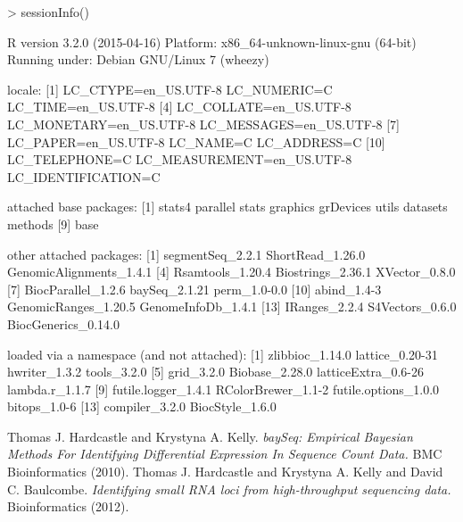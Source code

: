 \documentclass[a4paper]{article}
\begin{document}
\begin{Schunk}
\begin{Sinput}
> sessionInfo()
\end{Sinput}
\begin{Soutput}
R version 3.2.0 (2015-04-16)
Platform: x86_64-unknown-linux-gnu (64-bit)
Running under: Debian GNU/Linux 7 (wheezy)

locale:
 [1] LC_CTYPE=en_US.UTF-8       LC_NUMERIC=C               LC_TIME=en_US.UTF-8       
 [4] LC_COLLATE=en_US.UTF-8     LC_MONETARY=en_US.UTF-8    LC_MESSAGES=en_US.UTF-8   
 [7] LC_PAPER=en_US.UTF-8       LC_NAME=C                  LC_ADDRESS=C              
[10] LC_TELEPHONE=C             LC_MEASUREMENT=en_US.UTF-8 LC_IDENTIFICATION=C       

attached base packages:
[1] stats4    parallel  stats     graphics  grDevices utils     datasets  methods  
[9] base     

other attached packages:
 [1] segmentSeq_2.2.1        ShortRead_1.26.0        GenomicAlignments_1.4.1
 [4] Rsamtools_1.20.4        Biostrings_2.36.1       XVector_0.8.0          
 [7] BiocParallel_1.2.6      baySeq_2.1.21           perm_1.0-0.0           
[10] abind_1.4-3             GenomicRanges_1.20.5    GenomeInfoDb_1.4.1     
[13] IRanges_2.2.4           S4Vectors_0.6.0         BiocGenerics_0.14.0    

loaded via a namespace (and not attached):
 [1] zlibbioc_1.14.0      lattice_0.20-31      hwriter_1.3.2        tools_3.2.0         
 [5] grid_3.2.0           Biobase_2.28.0       latticeExtra_0.6-26  lambda.r_1.1.7      
 [9] futile.logger_1.4.1  RColorBrewer_1.1-2   futile.options_1.0.0 bitops_1.0-6        
[13] compiler_3.2.0       BiocStyle_1.6.0     
\end{Soutput}
\end{Schunk}

\begin{thebibliography}{99}
 Thomas J. Hardcastle and Krystyna A. Kelly. \textsl{baySeq: Empirical Bayesian Methods For Identifying Differential Expression In Sequence Count Data.} BMC Bioinformatics (2010).
 Thomas J. Hardcastle and Krystyna A. Kelly and David C. Baulcombe. \textsl{Identifying small RNA loci from high-throughput sequencing data.} Bioinformatics (2012).

\end{thebibliography}
\end{document}
